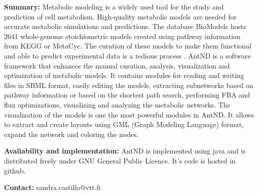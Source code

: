 
\textbf{Summary:} Metabolic modeling is a widely used tool for the study and prediction of cell metabolism. High-quality metabolic models are needed for accurate metabolic simulations and predictions. The database BioModels \cite{juty_biomodels:_2015} hosts 2641 whole-genome stoichiometric models created using pathway information from KEGG or MetaCyc. The curation of these models to make them functional and able to predict experimental data is a tedious process \cite{thiele_protocol_2010}. AntND is a software framework that enhances the manual curation, analysis, visualization and optimization of metabolic models. It contains modules for reading and writing files in SBML format, easily editing the models, extracting subnetworks based on pathway information or based on the shortest path search, performing FBA and flux optimizations, visualizing and analyzing the metabolic networks. The visualization of the models is one the most powerful modules in AntND. It allows to extract and create layouts using GML (Graph Modeling Language) format, expand the network and coloring the nodes.

\textbf{Avaliability and implementation:} AntND is implemented using java and is distributed freely under GNU General Public Licence. It's code is hosted in github. 

\textbf{Contact:} sandra.castillo@vtt.fi
